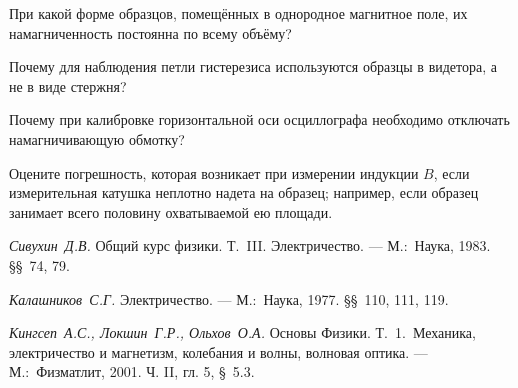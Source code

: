 \begin{lab:questions}
\item
При какой форме образцов, помещённых в однородное магнитное поле, их намагниченность постоянна по всему объёму?

\item
Почему для наблюдения петли гистерезиса используются образцы в видетора, а не в виде стержня?

\item
Почему при калибровке горизонтальной оси осциллографа необходимо от­ключать намагничивающую обмотку?

\item
Оцените погрешность, которая возникает при измерении индукции $B$, если измерительная катушка неплотно надета на образец; например, если образец занимает всего половину охватываемой ею площади.
\end{lab:questions}
\begin{lab:literature}
\item
\emph{Сивухин~Д.В.} Общий курс физики. Т.~III. Электричество. --- М.:~Наука, 1983. \S\S~74, 79.

\item
\emph{Калашников~С.Г.} Электричество. --- М.:~Наука, 1977. \S\S~110, 111, 119.

\item
\emph{Кингсеп~А.С., Локшин~Г.Р., Ольхов~О.А.} Основы Физики. Т.~1.~Механика, электричество и магнетизм, колебания и волны, волновая оптика. --- М.:~Физматлит, 2001. Ч. II, гл. 5, \S~5.3.
\end{lab:literature}
